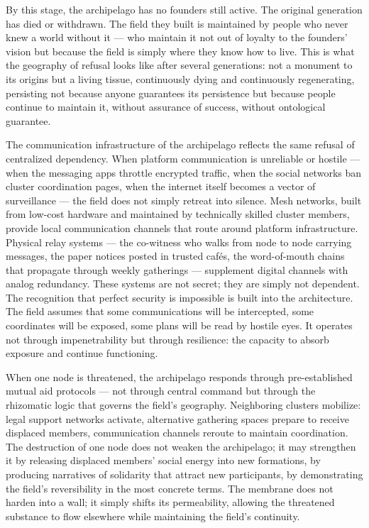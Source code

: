 By this stage, the archipelago has no founders still active. The original generation has died or withdrawn. The field they built is maintained by people who never knew a world without it — who maintain it not out of loyalty to the founders' vision but because the field is simply where they know how to live. This is what the geography of refusal looks like after several generations: not a monument to its origins but a living tissue, continuously dying and continuously regenerating, persisting not because anyone guarantees its persistence but because people continue to maintain it, without assurance of success, without ontological guarantee.

The communication infrastructure of the archipelago reflects the same refusal of centralized dependency. When platform communication is unreliable or hostile — when the messaging apps throttle encrypted traffic, when the social networks ban cluster coordination pages, when the internet itself becomes a vector of surveillance — the field does not simply retreat into silence. Mesh networks, built from low-cost hardware and maintained by technically skilled cluster members, provide local communication channels that route around platform infrastructure. Physical relay systems — the co-witness who walks from node to node carrying messages, the paper notices posted in trusted cafés, the word-of-mouth chains that propagate through weekly gatherings — supplement digital channels with analog redundancy. These systems are not secret; they are simply not dependent. The recognition that perfect security is impossible is built into the architecture. The field assumes that some communications will be intercepted, some coordinates will be exposed, some plans will be read by hostile eyes. It operates not through impenetrability but through resilience: the capacity to absorb exposure and continue functioning.

When one node is threatened, the archipelago responds through pre-established mutual aid protocols — not through central command but through the rhizomatic logic that governs the field's geography. Neighboring clusters mobilize: legal support networks activate, alternative gathering spaces prepare to receive displaced members, communication channels reroute to maintain coordination. The destruction of one node does not weaken the archipelago; it may strengthen it by releasing displaced members' social energy into new formations, by producing narratives of solidarity that attract new participants, by demonstrating the field's reversibility in the most concrete terms. The membrane does not harden into a wall; it simply shifts its permeability, allowing the threatened substance to flow elsewhere while maintaining the field's continuity.

